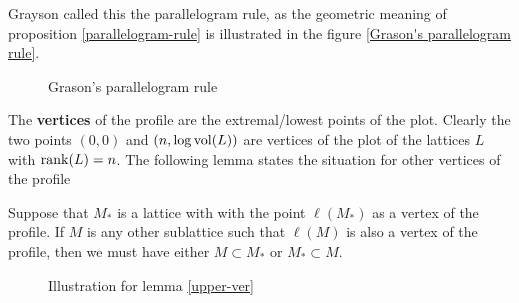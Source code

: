 Grayson called this the parallelogram rule, as the geometric meaning of  proposition \ref{parallelogram-rule} is
illustrated in the figure \ref{Grason's parallelogram rule}.
\begin{figure}[hbt!]
    \centering
    \caption{{Grason's parallelogram  rule}}
    \label{Grason's parallelogram  rule}
\end{figure}
The \textbf{vertices} of the profile are the extremal/lowest points of the plot. Clearly the two points
$(0,0)$ and $(n,\log\operatorname{vol}(L))$ are vertices of the plot of the lattices $L$ with $\operatorname{rank}(L)=n$. The following lemma states the situation for other vertices
of the profile
\begin{lemma}\label{upper-ver}\cite[Lemma 4.4]{MR2127941}
    Suppose that $M_\ast$ is a lattice with with the point $\ell(M_\ast)$ as a vertex of the profile. If $M$ is any other sublattice such that
    $\ell(M)$ is also a vertex of the profile, then we must have either $M \subset M_\ast$ or $M_\ast \subset M$.
\end{lemma}
\begin{figure}[H]
    \centering
    \caption{Illustration for lemma \ref{upper-ver}}
    \label{figure33}
\end{figure}
